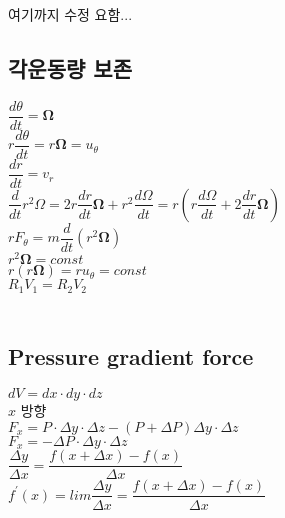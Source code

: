 여기까지 수정 요함...


\subsection{각운동량 보존}

$\dfrac{d \theta}{dt} = \mathbf {\Omega}$ \\

$ r\dfrac{d \theta}{dt} = r \mathbf {\Omega} = u_{\theta} $\\

$\dfrac{dr}{dt} = v_{r}$\\

$\dfrac{d}{dt} r^{2}\Omega = 2 r \dfrac{dr}{dt} \mathbf {\Omega} + r^{2} \dfrac{d\Omega}{dt} 
= r \left( r \dfrac{d\Omega}{dt} +2 \dfrac{dr}{dt} \mathbf {\Omega} \right) $\\

$ r F_{\theta} = m \dfrac{d}{dt} \left(r^{2} \mathbf {\Omega} \right) $\\

$ r^{2} \mathbf {\Omega} = const$\\

$ r \left( r \mathbf {\Omega} \right) = r u_{\theta} = const $ \\


$ R_{1} V_{1} = R_{2} V_{2}$\\
\\


\subsection{Pressure gradient force}

$ dV = dx \cdot dy \cdot dz $\\

$x$ 방향 \\

$ F_{x} = P \cdot \Delta y \cdot \Delta z - \left( P + \Delta P \right) \Delta y \cdot \Delta z$\\

$ F_{x} = - \Delta P \cdot \Delta y \cdot \Delta z $\\

$ \dfrac { \Delta y}{\Delta x } = \dfrac {f\left(x + \Delta x \right) - f\left(x \right)}{ \Delta x}$\\

$f^{\prime} \left(x \right) = lim \dfrac { \Delta y}{\Delta x } 
= \dfrac {f\left(x + \Delta x \right) - f\left(x \right)}{ \Delta x}$\\

